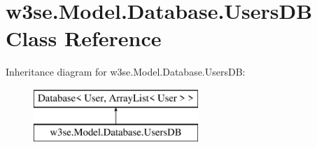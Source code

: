 \hypertarget{classw3se_1_1_model_1_1_database_1_1_users_d_b}{\section{w3se.\-Model.\-Database.\-Users\-D\-B Class Reference}
\label{classw3se_1_1_model_1_1_database_1_1_users_d_b}
}
Inheritance diagram for w3se.\-Model.\-Database.\-Users\-D\-B\-:\begin{figure}[H]
\begin{center}
\leavevmode
\includegraphics[height=2.000000cm]{classw3se_1_1_model_1_1_database_1_1_users_d_b}
\end{center}
\end{figure}
